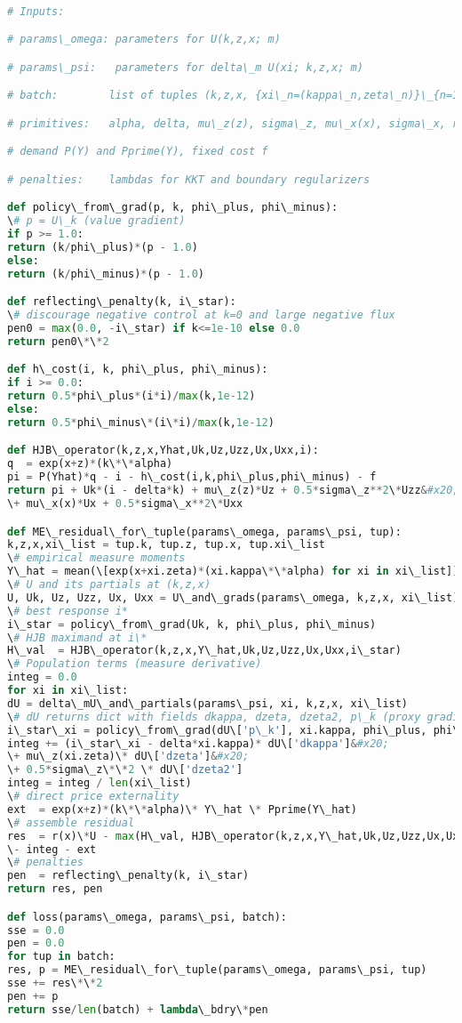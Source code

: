﻿\documentclass[11pt,letterpaper,oneside]{article}
\numberwithin{equation}{section}
\newcommand{\1}{\mathbf{1}}
\begin{document}
\begin{lstlisting}[language=Python,caption={Pseudo-JAX for (ME) residual with empirical measure}]

# Inputs:

# params\_omega: parameters for U(k,z,x; m)

# params\_psi:   parameters for delta\_m U(xi; k,z,x; m)

# batch:        list of tuples (k,z,x, {xi\_n=(kappa\_n,zeta\_n)}\_{n=1}^N )

# primitives:   alpha, delta, mu\_z(z), sigma\_z, mu\_x(x), sigma\_x, r(x),

# demand P(Y) and Pprime(Y), fixed cost f

# penalties:    lambdas for KKT and boundary regularizers

def policy\_from\_grad(p, k, phi\_plus, phi\_minus):
\# p = U\_k (value gradient)
if p >= 1.0:
return (k/phi\_plus)*(p - 1.0)
else:
return (k/phi\_minus)*(p - 1.0)

def reflecting\_penalty(k, i\_star):
\# discourage negative control at k=0 and large negative flux
pen0 = max(0.0, -i\_star) if k<=1e-10 else 0.0
return pen0\*\*2

def h\_cost(i, k, phi\_plus, phi\_minus):
if i >= 0.0:
return 0.5*phi\_plus*(i*i)/max(k,1e-12)
else:
return 0.5*phi\_minus\*(i\*i)/max(k,1e-12)

def HJB\_operator(k,z,x,Yhat,Uk,Uz,Uzz,Ux,Uxx,i):
q  = exp(x+z)*(k\*\*alpha)
pi = P(Yhat)*q - i - h\_cost(i,k,phi\_plus,phi\_minus) - f
return pi + Uk*(i - delta*k) + mu\_z(z)*Uz + 0.5*sigma\_z**2\*Uzz&#x20;
\+ mu\_x(x)*Ux + 0.5*sigma\_x**2\*Uxx

def ME\_residual\_for\_tuple(params\_omega, params\_psi, tup):
k,z,x,xi\_list = tup.k, tup.z, tup.x, tup.xi\_list
\# empirical measure moments
Y\_hat = mean(\[exp(x+xi.zeta)*(xi.kappa\*\*alpha) for xi in xi\_list])
\# U and its partials at (k,z,x)
U, Uk, Uz, Uzz, Ux, Uxx = U\_and\_grads(params\_omega, k,z,x, xi\_list)
\# best response i*
i\_star = policy\_from\_grad(Uk, k, phi\_plus, phi\_minus)
\# HJB maximand at i\*
H\_val  = HJB\_operator(k,z,x,Y\_hat,Uk,Uz,Uzz,Ux,Uxx,i\_star)
\# Population terms (measure derivative)
integ = 0.0
for xi in xi\_list:
dU = delta\_mU\_and\_partials(params\_psi, xi, k,z,x, xi\_list)
\# dU returns dict with fields dkappa, dzeta, dzeta2, p\_k (proxy gradient)
i\_star\_xi = policy\_from\_grad(dU\['p\_k'], xi.kappa, phi\_plus, phi\_minus)
integ += (i\_star\_xi - delta*xi.kappa)* dU\['dkappa']&#x20;
\+ mu\_z(xi.zeta)\* dU\['dzeta']&#x20;
\+ 0.5*sigma\_z\*\*2 \* dU\['dzeta2']
integ = integ / len(xi\_list)
\# direct price externality
ext  = exp(x+z)*(k\*\*alpha)\* Y\_hat \* Pprime(Y\_hat)
\# assemble residual
res  = r(x)\*U - max(H\_val, HJB\_operator(k,z,x,Y\_hat,Uk,Uz,Uzz,Ux,Uxx,0.0))&#x20;
\- integ - ext
\# penalties
pen  = reflecting\_penalty(k, i\_star)
return res, pen

def loss(params\_omega, params\_psi, batch):
sse = 0.0
pen = 0.0
for tup in batch:
res, p = ME\_residual\_for\_tuple(params\_omega, params\_psi, tup)
sse += res\*\*2
pen += p
return sse/len(batch) + lambda\_bdry\*pen
\end{lstlisting}
\end{document}
